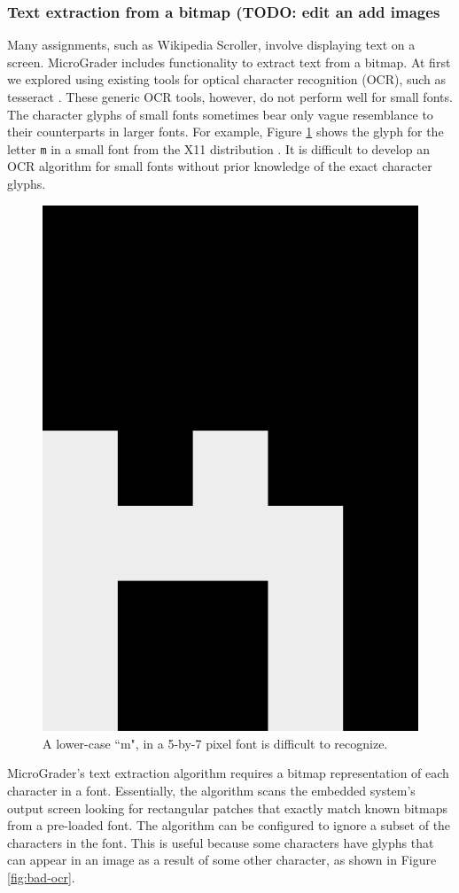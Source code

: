 \documentclass[12pt]{article}
\begin{document}
\subsubsection{Text extraction from a bitmap (TODO: edit an add images}
Many assignments, such as Wikipedia Scroller, involve displaying text on a screen.  MicroGrader includes functionality to extract text from a bitmap.  At first we explored using existing tools for optical character recognition (OCR), such as tesseract \cite{tesseract}.  These generic OCR tools, however, do not perform well for small fonts.  The character glyphs of small fonts sometimes bear only vague resemblance to their counterparts in larger fonts.  For example, Figure \ref{fig:small-glyph} shows the glyph for the letter \texttt{m} in a small font from the X11 distribution \cite{5x7}.  It is difficult to develop an OCR algorithm for small fonts without prior knowledge of the exact character glyphs.


\begin{figure}
\centering
\includegraphics[width=0.3\linewidth]{glyph-m.png}
\caption{A lower-case ``m", in a 5-by-7 pixel font is difficult to recognize.}
\label{fig:small-glyph}
\end{figure}

MicroGrader's text extraction algorithm requires a bitmap representation of each character in a font.  Essentially, the algorithm scans the embedded system's output screen looking for rectangular patches that exactly match known bitmaps from a pre-loaded font.  The algorithm can be configured to ignore a subset of the characters in the font.  This is useful because some characters have glyphs that can appear in an image as a result of some other character, as shown in Figure \ref{fig:bad-ocr}.
\end{document}
